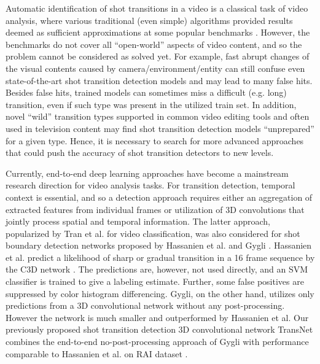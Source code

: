 \documentclass[sigconf]{acmart}
\begin{document}
Automatic identification of shot transitions in a video is a classical task of video analysis, where various traditional (even simple) algorithms provided results deemed as sufficient approximations at some popular benchmarks \cite{SMEATON2010411}. However, the benchmarks do not cover all ``open-world'' aspects of video content, and so the problem cannot be considered as solved yet. For example, fast abrupt changes of the visual contents caused by camera/environment/entity can still confuse even state-of-the-art shot transition detection models and may lead to many false hits. Besides false hits, trained models can sometimes miss a difficult (e.g. long) transition, even if such type was present in the utilized train set. In addition, novel ``wild'' transition types supported in common video editing tools and often used in television content may find shot transition detection models ``unprepared'' for a given type. Hence, it is necessary to search for more advanced approaches that could push the accuracy of shot transition detectors to new levels.

Currently, end-to-end deep learning approaches have become a mainstream research direction for video analysis tasks. For transition detection, temporal context is essential, and so a detection approach requires either an aggregation of extracted features from individual frames \cite{Karpathy_2014_CVPR} or utilization of 3D convolutions that jointly process spatial and temporal information.
The latter approach, popularized by Tran et al. \cite{tran2015learning} for video classification, was also considered for shot boundary detection networks proposed by Hassanien et al. \cite{HassanienESHM17} and Gygli \cite{Gygli17}.
Hassanien et al. predict a likelihood of sharp or gradual transition in a 16 frame sequence by the C3D network \cite{tran2015learning}. The predictions are, however, not used directly, and an SVM classifier is trained to give a labeling estimate. Further, some false positives are suppressed by color histogram differencing. Gygli, on the other hand, utilizes only predictions from a 3D convolutional network without any post-processing. However the network is much smaller and outperformed by Hassanien et al. Our previously proposed shot transition detection 3D convolutional network TransNet \cite{transnet} combines the end-to-end no-post-processing approach of Gygli with performance comparable to Hassanien et al. on RAI dataset \cite{Baraldi15RAI}.
\end{document}
